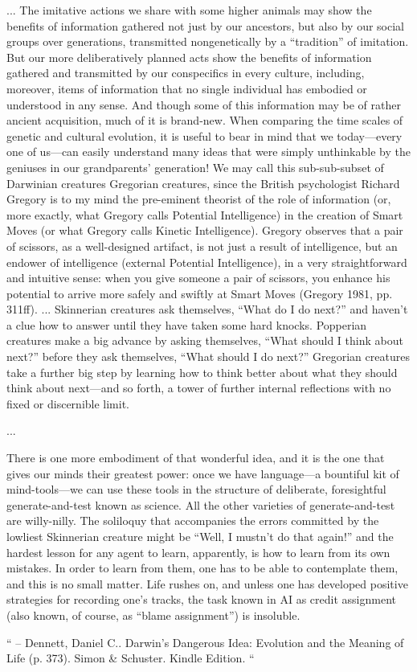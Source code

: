 {    %
    ...
The imitative actions we share with some higher animals may show the benefits of information gathered not just by our ancestors, but also by our social groups over generations, transmitted nongenetically by a “tradition” of imitation. But our more deliberatively planned acts show the benefits of information gathered and transmitted by our conspecifics in every culture, including, moreover, items of information that no single individual has embodied or understood in any sense. And though some of this information may be of rather ancient acquisition, much of it is brand-new. When comparing the time scales of genetic and cultural evolution, it is useful to bear in mind that we today—every one of us—can easily understand many ideas that were simply unthinkable by the geniuses in our grandparents’ generation! We may call this sub-sub-subset of Darwinian creatures Gregorian creatures, since the British psychologist Richard Gregory is to my mind the pre-eminent theorist of the role of information (or, more exactly, what Gregory calls Potential Intelligence) in the creation of Smart Moves (or what Gregory calls Kinetic Intelligence). Gregory observes that a pair of scissors, as a well-designed artifact, is not just a result of intelligence, but an endower of intelligence (external Potential Intelligence), in a very straightforward and intuitive sense: when you give someone a pair of scissors, you enhance his potential to arrive more safely and swiftly at Smart Moves (Gregory 1981, pp. 311ff).
    ...
Skinnerian creatures ask themselves, “What do I do next?” and haven’t a clue how to answer until they have taken some hard knocks. Popperian creatures make a big advance by asking themselves, “What should I think about next?” before they ask themselves, “What should I do next?” Gregorian creatures take a further big step by learning how to think better about what they should think about next—and so forth, a tower of further internal reflections with no fixed or discernible limit.

    ...

There is one more embodiment of that wonderful idea, and it is the one that gives our minds their greatest power: once we have language—a bountiful kit of mind-tools—we can use these tools in the structure of deliberate, foresightful generate-and-test known as science. All the other varieties of generate-and-test are willy-nilly. The soliloquy that accompanies the errors committed by the lowliest Skinnerian creature might be “Well, I mustn’t do that again!” and the hardest lesson for any agent to learn, apparently, is how to learn from its own mistakes. In order to learn from them, one has to be able to contemplate them, and this is no small matter. Life rushes on, and unless one has developed positive strategies for recording one’s tracks, the task known in AI as credit assignment (also known, of course, as “blame assignment”) is insoluble.


    `` -- Dennett, Daniel C.. Darwin's Dangerous Idea: Evolution and the Meaning of Life (p. 373). Simon & Schuster. Kindle Edition. ``
}


